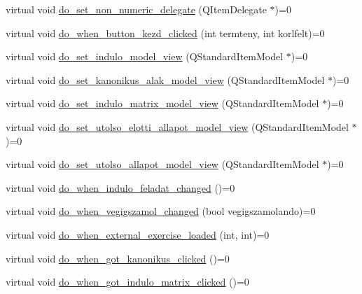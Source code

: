 \begin{DoxyCompactItemize}
\item 
virtual void \hyperlink{classMainwindow__Gui__Plugin__Interface_a7fb8659febc1f411b057c218a384533d}{do\+\_\+set\+\_\+non\+\_\+numeric\+\_\+delegate} (Q\+Item\+Delegate $\ast$)=0
\item 
virtual void \hyperlink{classMainwindow__Gui__Plugin__Interface_adb2a0db1dc3a4acbbe3face497fea03d}{do\+\_\+when\+\_\+button\+\_\+kezd\+\_\+clicked} (int termteny, int korlfelt)=0
\item 
virtual void \hyperlink{classMainwindow__Gui__Plugin__Interface_a35df40a34eaf1d707d41db3f13862469}{do\+\_\+set\+\_\+indulo\+\_\+model\+\_\+view} (Q\+Standard\+Item\+Model $\ast$)=0
\item 
virtual void \hyperlink{classMainwindow__Gui__Plugin__Interface_a88a3437df47fa2957d31f487c22c5fad}{do\+\_\+set\+\_\+kanonikus\+\_\+alak\+\_\+model\+\_\+view} (Q\+Standard\+Item\+Model $\ast$)=0
\item 
virtual void \hyperlink{classMainwindow__Gui__Plugin__Interface_aeec7915d58c85d9d837c5faa50c9e567}{do\+\_\+set\+\_\+indulo\+\_\+matrix\+\_\+model\+\_\+view} (Q\+Standard\+Item\+Model $\ast$)=0
\item 
virtual void \hyperlink{classMainwindow__Gui__Plugin__Interface_aaea5fac6dda86b300c88ea75462f1d27}{do\+\_\+set\+\_\+utolso\+\_\+elotti\+\_\+allapot\+\_\+model\+\_\+view} (Q\+Standard\+Item\+Model $\ast$)=0
\item 
virtual void \hyperlink{classMainwindow__Gui__Plugin__Interface_a8e804ad75d1078c5331ce8c9a0a6e14d}{do\+\_\+set\+\_\+utolso\+\_\+allapot\+\_\+model\+\_\+view} (Q\+Standard\+Item\+Model $\ast$)=0
\item 
virtual void \hyperlink{classMainwindow__Gui__Plugin__Interface_a844f70d7abef6c8a80a29247d9156bad}{do\+\_\+when\+\_\+indulo\+\_\+feladat\+\_\+changed} ()=0
\item 
virtual void \hyperlink{classMainwindow__Gui__Plugin__Interface_a923f8d92254deadb309f933167c3da70}{do\+\_\+when\+\_\+vegigszamol\+\_\+changed} (bool vegigszamolando)=0
\item 
virtual void \hyperlink{classMainwindow__Gui__Plugin__Interface_a3e925760da906a6cfcc0d9408de19312}{do\+\_\+when\+\_\+external\+\_\+exercise\+\_\+loaded} (int, int)=0
\item 
virtual void \hyperlink{classMainwindow__Gui__Plugin__Interface_a81663cee1a75c8ed846e84c402dbc26c}{do\+\_\+when\+\_\+got\+\_\+kanonikus\+\_\+clicked} ()=0
\item 
virtual void \hyperlink{classMainwindow__Gui__Plugin__Interface_a914d476057d5060ff6cacbcb8a0e235b}{do\+\_\+when\+\_\+got\+\_\+indulo\+\_\+matrix\+\_\+clicked} ()=0

\end{DoxyCompactItemize}
